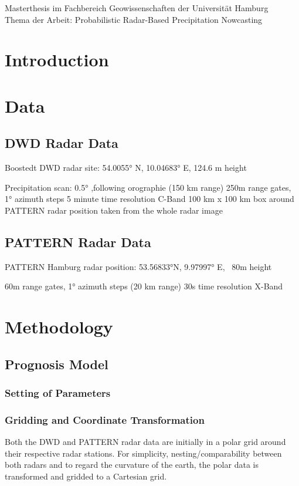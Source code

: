 \documentclass[11pt,twoside,a4paper,fleqn]{report}
\numberwithin{equation}{chapter}
\numberwithin{figure}{chapter}
\numberwithin{table}{chapter}
\begin{document}
	\newpage
	\thispagestyle{empty}
	\null
	\vfill
	Masterthesis im Fachbereich Geowissenschaften der Universität Hamburg\\
	Thema der Arbeit: \glqq Probabilistic Radar-Based Precipitation Nowcasting\grqq
	
	
\newpage
\renewcommand{\abstractname}{\huge \flushleft Abstract}
\begin{abstract}
\null
\end{abstract}
\thispagestyle{empty}
\pagestyle{empty}
\tableofcontents
\listoffigures
\listoftables
\newpage\pagestyle{fancy}
\chapter{Introduction}
\chapter{Data}
\section{DWD Radar Data}
Boostedt DWD radar site: 54.0055° N, 10.04683° E, 124.6 m height

Precipitation scan: 0.5° ,following orographie (150 km range)
250m range gates, 1° azimuth steps
5 minute time resolution
C-Band
100 km x 100 km box around PATTERN radar position taken from the whole radar image
\section{PATTERN Radar Data}
PATTERN Hamburg radar position: 53.56833°N, 9.97997° E, ~80m height

60m range gates, 1° azimuth steps (20 km range)
30s time resolution
X-Band
\chapter{Methodology}
\section{Prognosis Model}
\subsection{Setting of Parameters}
\subsection{Gridding and Coordinate Transformation}
Both the DWD and PATTERN radar data are initially in a polar grid around their respective radar stations. For simplicity, nesting/comparability between both radars and to regard the curvature of the earth, the polar data is transformed and gridded to a Cartesian grid. 
\end{document}
